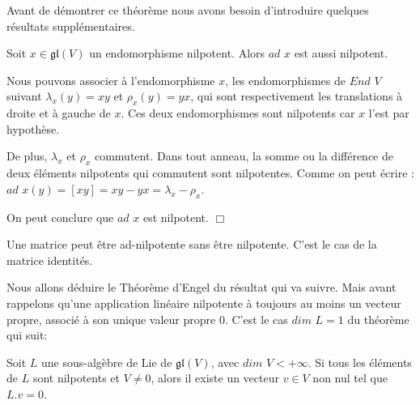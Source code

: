 \documentclass[a4paper,openany,12pt]{report}
\newcommand{\gl}{\mathfrak{gl}}
\theoremstyle{break}
{\theorembodyfont{\upshape}
\newtheorem*{rmq}{Remarque :}
\newtheorem*{prv}{Preuve :}
\newtheorem*{ex}{Exemples :}
\newtheorem{exe}{Exemple : }
\newtheorem*{nota}{Notation :}}
\begin{document}
\quad Avant de démontrer ce théorème nous avons besoin d’introduire quelques résultats supplémentaires.

\begin{lem}\label{lem:E1}
\quad Soit $x \in \gl(V)$ un endomorphisme nilpotent. Alors $ad$ $x$ est aussi nilpotent. 
\end{lem}

\begin{prv}
\quad Nous pouvons associer à l'endomorphisme $x$, les endomorphismes de $End$ $V$ suivant $\lambda_{x}(y)=xy$ et $\rho_{x}(y)=yx$, qui sont respectivement les translations à droite et à gauche de $x$. Ces deux endomorphismes sont nilpotents car $x$ l'est par hypothèse.

De plus, $\lambda_{x}$ et $\rho_{x}$ commutent. Dans tout anneau, la somme ou la différence de deux éléments nilpotents qui commutent sont nilpotentes. Comme on peut écrire :
$ad$ $x(y)= [xy] = xy-yx = \lambda_{x} - \rho_{x}$.

On peut conclure que $ad$ $x$ est nilpotent. $\Box$
\end{prv}

\begin{rmq}
\quad Une matrice peut être ad-nilpotente sans être nilpotente. C'est le cas de la matrice identités. 
\end{rmq}

Nous allons déduire le Théorème d'Engel du résultat qui va suivre. Mais avant rappelons qu'une application linéaire nilpotente à toujours au moins un vecteur propre, associé à son unique valeur propre $0$. C'est le cas $dim$  $L = 1$ du théorème qui suit:

\begin{thm}\label{thm:E1}
\quad Soit $L$ une sous-algèbre de Lie de $\gl (V)$, avec $dim$ $V < + \infty$. Si tous les éléments de $L$ sont nilpotents et $V  \neq  0$, alors il existe un vecteur $v \in V$ non nul tel que $L.v = 0$.
\end{thm}
\end{document}
